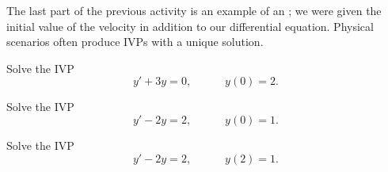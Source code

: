 \begin{applicationActivities}
\begin{definition}
The last part of the previous activity is an example of an ; we were given the initial value of the velocity in addition to our differential equation.
\vfill
Physical scenarios often produce IVPs with a unique solution.
\end{definition}

\begin{activity}{10}
Solve the IVP
\[y'+3y=0,\hspace{3em} y(0)=2.\]
\end{activity}

\begin{activity}{10}
Solve the IVP
\[y'-2y=2, \hspace{3em} y(0)=1.\]
\end{activity}

\begin{activity}{5}
Solve the IVP
\[y'-2y=2, \hspace{3em} y(2)=1.\]
\end{activity}




\end{applicationActivities}

